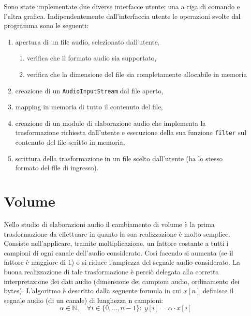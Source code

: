 \documentclass[a4papper]{article}
\begin{document}
Sono state implementate due diverse interfacce utente: una a riga di
comando e l'altra grafica. Indipendentemente dall'interfaccia utente
le operazioni svolte dal programma sono le seguenti:

\begin{enumerate}
\item apertura di un file audio, selezionato dall'utente,
  \begin {enumerate}
  \item verifica che il formato audio sia supportato,
  \item verifica che la dimensione del file sia completamente
    allocabile in memoria
  \end{enumerate}
\item creazione di un \verb+AudioInputStream+ dal file aperto,
\item mapping in memoria di tutto il contenuto del file,
\item creazione di un modulo di elaborazione audio che implementa la
  trasformazione richiesta dall'utente e esecuzione della sua funzione
  \verb+filter+ sul contenuto del file scritto in memoria,
\item scrittura della trasformazione in un file scelto dall'utente (ha
  lo stesso formato del file di ingresso).
\end{enumerate}


\section{Volume}
Nello studio di elaborazioni audio il cambiamento di volume \`e la
prima trasformazione da effettuare in quanto la sua realizzazione \`e
molto semplice. Consiste nell'applicare, tramite moltiplicazione, un
fattore costante a tutti i campioni di ogni canale dell'audio
considerato. Cos\`i facendo si aumenta (se il fattore \`e maggiore di
1) o si riduce l'ampiezza del segnale audio considerato. La buona
realizzazione di tale trasformazione \`e perci\`o delegata alla
corretta interpretazione dei dati audio (dimensione dei campioni
audio, ordinamento dei bytes). L'algoritmo \`e descritto dalla
seguente formula in cui $x[n]$ definisce il segnale audio (di un
canale) di lunghezza n campioni:
$$ \alpha \in \mathbb{N},\quad \forall i \in \{0, \dots, n-1\} \colon \;
y[i] = \alpha \cdot x[i]$$
\end{document}
